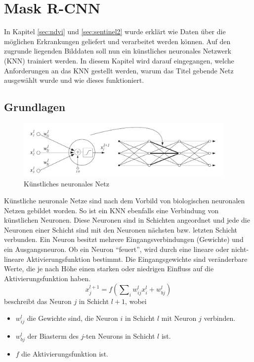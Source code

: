 \section{Mask R-CNN}\label{sec:maskrcnn}
In Kapitel \ref{sec:ndvi} und \ref{sec:sentinel2} wurde erklärt wie Daten über die möglichen Erkrankungen geliefert und verarbeitet werden können. Auf den zugrunde liegenden Bilddaten soll nun ein künstliches neuronales Netzwerk (KNN) trainiert werden. In diesem Kapitel wird darauf eingegangen, welche Anforderungen an das KNN gestellt werden, warum das Titel gebende Netz ausgewählt wurde und wie dieses funktioniert.

\subsection{Grundlagen}\label{sec:sub:basics}

\begin{figure}[ht]
  \centering
  \includegraphics[width=0.95\textwidth]{pics/neural-net.PNG}
  \caption[Künstliches neuronales Netz]{Künstliches neuronales Netz\cite{ref:verrelst}}
  \label{fig:ann}
\end{figure}

\noindent
Künstliche neuronale Netze sind nach dem Vorbild von biologischen neuronalen Netzen gebildet worden. So ist ein KNN ebenfalls eine Verbindung von künstlichen Neuronen. Diese Neuronen sind in Schichten angeordnet und jede die Neuronen einer Schicht sind mit den Neuronen nächsten bzw. letzten Schicht verbunden. Ein Neuron besitzt mehrere Eingangsverbindungen (Gewichte) und ein Ausgangsneuron. Ob ein Neuron "`feuert"', wird durch eine lineare oder nicht-lineare Aktivierungsfunktion bestimmt. Die Eingangsgewichte sind veränderbare Werte, die je nach Höhe einen starken oder niedrigen Einfluss auf die Aktivierungsfunktion haben.
\begin{equation}\label{equ:neuron}
x^{l+1}_{j}=f(\sum\nolimits_i w^l_{ij}x^l_i + w^l_{bj})
\end{equation}
beschreibt das Neuron $j$ in Schicht $l+1$, wobei
\begin{itemize}
	\item $w^l_{ij}$ die Gewichte sind, die Neuron $i$ in Schicht $l$ mit Neuron $j$ verbinden.
	\item $w^l_{bj}$ der Biasterm des $j$-ten Neurons in Schicht $l$ ist.
	\item $f$ die Aktivierungsfunktion ist.\cite{ref:verrelst}
\end{itemize} 

